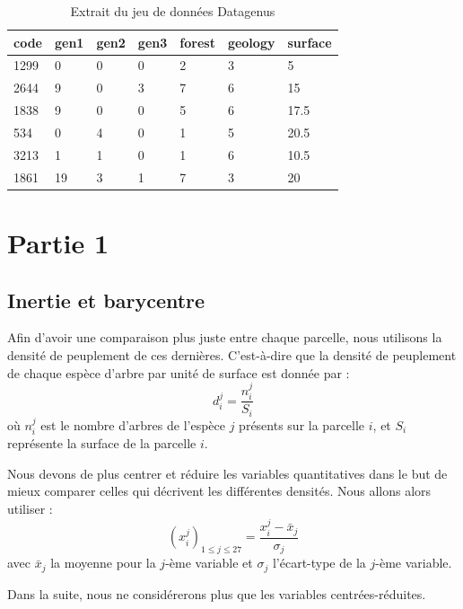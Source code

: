 \documentclass{article}
\begin{document}
\begin{table}[H]
    \caption{Extrait du jeu de données Datagenus}
    \centering
    \begin{tabular}{|l|l|l|l|l|l|l|}
    \hline
    code & gen1 & gen2 & gen3 & forest & geology & surface \\ \hline
    1299 & 0    & 0    & 0    & 2      & 3       & 5       \\ \hline
    2644 & 9    & 0    & 3    & 7      & 6       & 15      \\ \hline
    1838 & 9    & 0    & 0    & 5      & 6       & 17.5    \\ \hline
    534  & 0    & 4    & 0    & 1      & 5       & 20.5    \\ \hline
    3213 & 1    & 1    & 0    & 1      & 6       & 10.5    \\ \hline
    1861 & 19   & 3    & 1    & 7      & 3       & 20      \\ \hline
    \end{tabular}
\end{table}



\section{Partie 1}
\subsection{Inertie et barycentre}

Afin d'avoir une comparaison plus juste entre chaque parcelle, nous utilisons la densité de peuplement de ces dernières. C'est-à-dire que la densité de peuplement de chaque espèce d'arbre par unité de surface est donnée par :
\[
d^j_i = \frac{n^j_i}{S_i}
\]
où $n^j_i$ est le nombre d'arbres de l'espèce $j$ présents sur la parcelle $i$, et $S_i$ représente la surface de la parcelle $i$.

Nous devons de plus centrer et réduire les variables quantitatives dans le but de mieux comparer celles qui décrivent les différentes densités. Nous allons alors utiliser :
\[
(x^j_i)_{1 \leq j \leq 27} = \frac{x^j_i - \bar{x}_j}{\sigma_j}
\]
avec $\bar{x}_j$ la moyenne pour la $j$-ème variable et $\sigma_j$ l'écart-type de la $j$-ème variable.

Dans la suite, nous ne considérerons plus que les variables centrées-réduites.
\end{document}
